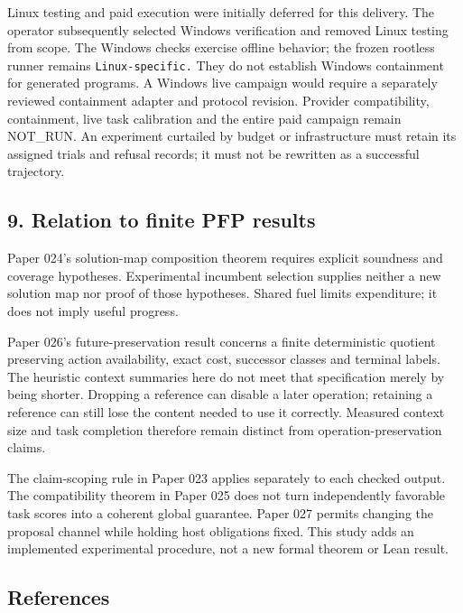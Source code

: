 \documentclass[
  11pt,
]{article}
\begin{document}
Linux testing and paid execution were initially deferred for this
delivery. The operator subsequently selected Windows verification and
removed Linux testing from scope. The Windows checks exercise offline
behavior; the frozen rootless runner remains \nolinkurl{Linux-specific.}
They do not establish Windows containment for generated programs. A
Windows live campaign would require a separately reviewed containment
adapter and protocol revision. Provider compatibility, containment, live
task calibration and the entire paid campaign remain NOT\_RUN. An
experiment curtailed by budget or infrastructure must retain its
assigned trials and refusal records; it must not be rewritten as a
successful trajectory.

\subsection{9. Relation to finite PFP
results}\label{relation-to-finite-pfp-results}

Paper 024's solution-map composition theorem requires explicit soundness
and coverage hypotheses. Experimental incumbent selection supplies
neither a new solution map nor proof of those hypotheses. Shared fuel
limits expenditure; it does not imply useful progress.

Paper 026's future-preservation result concerns a finite deterministic
quotient preserving action availability, exact cost, successor classes
and terminal labels. The heuristic context summaries here do not meet
that specification merely by being shorter. Dropping a reference can
disable a later operation; retaining a reference can still lose the
content needed to use it correctly. Measured context size and task
completion therefore remain distinct from operation-preservation claims.

The claim-scoping rule in Paper 023 applies separately to each checked
output. The compatibility theorem in Paper 025 does not turn
independently favorable task scores into a coherent global guarantee.
Paper 027 permits changing the proposal channel while holding host
obligations fixed. This study adds an implemented experimental
procedure, not a new formal theorem or Lean result.

\subsection{References}\label{references}
\end{document}
